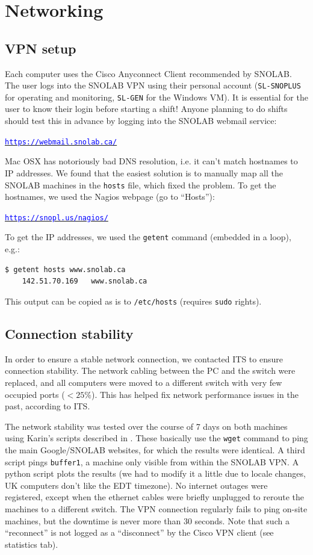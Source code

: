 \documentclass[a4paper,10pt]{article}
\newcommand{\link}[1]{\href{#1}{\textcolor{blue}{\texttt{#1}}}} %
\begin{document}

\section{Networking}

\subsection{VPN setup}
Each computer uses the Cisco Anyconnect Client recommended by SNOLAB. The user logs into the SNOLAB VPN using their personal account ({\tt SL-SNOPLUS} for operating and monitoring, {\tt SL-GEN} for the Windows VM). It is essential for the user to know their login before starting a shift! Anyone planning to do shifts should test this in advance by logging into the SNOLAB webmail service: 

\qquad\link{https://webmail.snolab.ca/}

Mac OSX has notoriously bad DNS resolution, i.e. it can't match hostnames to IP addresses. We found that the easiest solution is to manually map all the SNOLAB machines in the {\tt hosts} file, which fixed the problem. To get the hostnames, we used the Nagios webpage (go to ``Hosts''):

\qquad\link{https://snopl.us/nagios/}

To get the IP addresses, we used the {\tt getent} command (embedded in a loop), e.g.:
\begin{Verbatim}[xleftmargin=-8mm]
	$ getent hosts www.snolab.ca
	142.51.70.169   www.snolab.ca
\end{Verbatim}
This output can be copied as is to {\tt /etc/hosts} (requires {\tt sudo} rights).

\subsection{Connection stability}
In order to ensure a stable network connection, we contacted ITS to ensure connection stability. The network cabling between the PC and the switch were replaced, and all computers were moved to a different switch with very few occupied ports ($<25\%$). This has helped fix network performance issues in the past, according to ITS.

The network stability was tested over the course of 7 days on both machines using Karin's scripts described in \cite{doc5040}. These basically use the {\tt wget} command to ping the main Google/SNOLAB websites, for which the results were identical. A third script pings {\tt buffer1}, a machine only visible from within the SNOLAB VPN. A python script plots the results (we had to modify it a little due to locale changes, UK computers don't like the EDT timezone). No internet outages were registered, except when the ethernet cables were briefly unplugged to reroute the machines to a different switch. The VPN connection regularly fails to ping on-site machines, but the downtime is never more than 30 seconds. Note that such a ``reconnect'' is not logged as a ``disconnect'' by the Cisco VPN client (see statistics tab).
\end{document}
